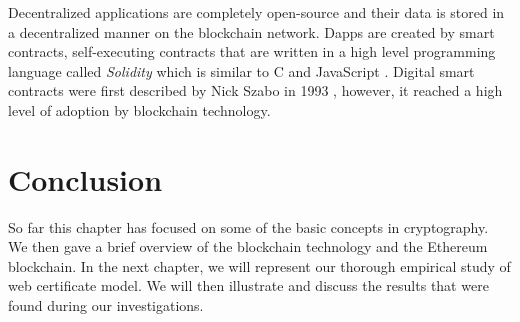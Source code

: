 Decentralized applications are completely open-source and their data is stored in a decentralized manner on the blockchain network. Dapps are created by smart contracts, self-executing contracts that are written in a high level programming language called \emph{Solidity} which is similar to C and JavaScript \cite{Ethereum41:online}. Digital smart contracts were first described by Nick Szabo in 1993 \cite{szabo1997formalizing}, however, it reached a high level of adoption by blockchain technology. 


\section{Conclusion}
So far this chapter has focused on some of the basic concepts in cryptography. We then gave a brief overview of the blockchain technology and the Ethereum blockchain. In the next chapter, we will represent our thorough empirical study of web certificate model. We will then illustrate and discuss the results that were found during our investigations.









